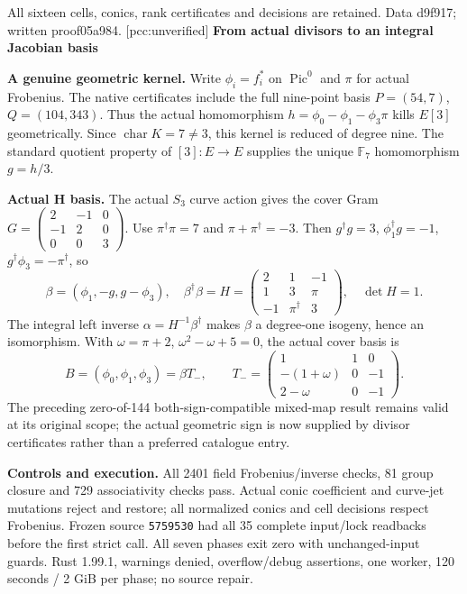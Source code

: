 \documentclass[10pt,a4paper]{article}
\begin{document}
All sixteen cells, conics, rank certificates and decisions are retained.
Data d9f917; written proof05a984. [pcc:unverified]
\newpage
{\Large\bfseries From actual divisors to an integral Jacobian basis}\par

\textbf{A genuine geometric kernel.} Write $\phi_i=f_i^*$ on
$\operatorname{Pic}^0$ and $\pi$ for actual Frobenius. The native
certificates include the full nine-point basis
$P=(54,7)$, $Q=(104,343)$. Thus the actual homomorphism
$h=\phi_0-\phi_1-\phi_3\pi$ kills $E[3]$ geometrically. Since
$\operatorname{char}K=7\ne3$, this kernel is reduced of degree nine.
The standard quotient property of $[3]:E\to E$ supplies the unique
$\mathbb F_7$ homomorphism $g=h/3$.

\textbf{Actual H basis.} The actual $S_3$ curve action gives the cover
Gram $G=\left(\begin{smallmatrix}2&-1&0\\-1&2&0\\0&0&3\end{smallmatrix}\right)$.
Use $\pi^\dagger\pi=7$ and $\pi+\pi^\dagger=-3$. Then
$g^\dagger g=3$, $\phi_1^\dagger g=-1$,
$g^\dagger\phi_3=-\pi^\dagger$, so
\[
 \beta=(\phi_1,-g,g-\phi_3),\quad
 \beta^\dagger\beta=H=
 \begin{pmatrix}2&1&-1\\1&3&\pi\\-1&\pi^\dagger&3\end{pmatrix},
 \quad \det H=1.
\]
The integral left inverse $\alpha=H^{-1}\beta^\dagger$ makes $\beta$
a degree-one isogeny, hence an isomorphism. With $\omega=\pi+2$,
$\omega^2-\omega+5=0$, the actual cover basis is
\[
 B=(\phi_0,\phi_1,\phi_3)=\beta T_-,\qquad
 T_-=\begin{pmatrix}1&1&0\\-(1+\omega)&0&-1\\2-\omega&0&-1\end{pmatrix}.
\]
The preceding zero-of-144 both-sign-compatible mixed-map result remains
valid at its original scope; the actual geometric sign is now supplied
by divisor certificates rather than a preferred catalogue entry.

\textbf{Controls and execution.} All 2401 field Frobenius/inverse checks,
81 group closure and 729 associativity checks pass. Actual conic
coefficient and curve-jet mutations reject and restore; all normalized
conics and cell decisions respect Frobenius. Frozen source
\texttt{5759530} had all 35 complete input/lock readbacks before the
first strict call. All seven phases exit zero with unchanged-input
guards. Rust 1.99.1, warnings denied, overflow/debug assertions,
one worker, 120 seconds / 2 GiB per phase; no source repair.
\end{document}
